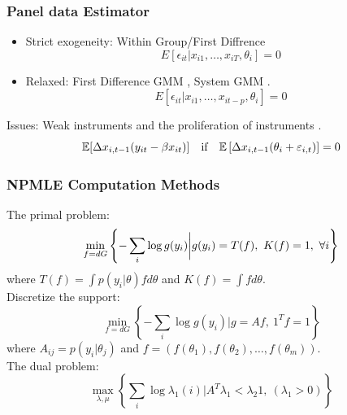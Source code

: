 \documentclass[10pt,mathserif,aspectratio=169]{beamer}
\begin{document}
\begin{frame}
  \frametitle{Panel data Estimator}
  \begin{itemize}\itemsep=12pt
    \item Strict exogeneity: Within Group/First Diffrence
          \begin{equation*}
            E[\epsilon_{it}|x_{i1},\ldots, x_{iT},\theta_i]=0
          \end{equation*}
    \item Relaxed: First Difference GMM \citep{arellano1991some}, System GMM
          \citep{arellano1995another,blundell1998initial}.
          \begin{equation*}
            E[\epsilon_{it}|x_{i1},\ldots, x_{it-p},\theta_i]=0
          \end{equation*}
  \end{itemize}

  Issues: Weak instruments \citep{blundell_bond_1998} and the proliferation of
  instruments \citep{roodman2007short}.
  \begin{equation*}
    \mathbb{E}[\Delta x_{i,t-1}(y_{it}-\beta x_{it})] \quad \text{if}\quad \mathbb{E}\left[\Delta x_{i,t-1}(\theta_i+\varepsilon_{i,t})\right]=0
  \end{equation*}
\end{frame}

\begin{frame}
  \frametitle{NPMLE Computation Methods}

  The primal problem:
  \begin{equation*}
    \min_{f=dG}\left\{-\sum_i \log g(y_i)\bigg |g(y_i) = T(f),\ K(f)=1,\ \forall i \right\}
  \end{equation*}
  where $ T(f)=\int p(y_i |\theta)fd\theta $ and  $K(f)= \int f d\theta$.\\
  Discretize the support:
  \begin{equation*}
    \min_{f=dG}\left\{-\sum_i \log g(y_i)\bigg |g=Af,\ {1^T}f=1\right\}
  \end{equation*}
  where $A_{ij}= p(y_i|\theta_j) $ and $ f = (f(\theta_1),f(\theta_2),\ldots,f(\theta_m))$.\\
  The dual problem:
  \begin{equation*}
    \max_{\lambda,\mu} \left\{ \sum_i \log \lambda_1(i) \bigg| A^T\lambda_1 < \lambda_2 1,\ (\lambda_1>0) \right\}
  \end{equation*}
\end{frame}
\end{document}
